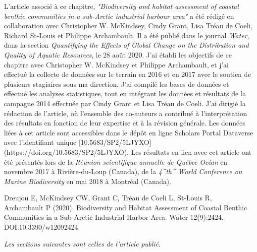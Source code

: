 L'article associé à ce chapitre, \textit{"Biodiversity and habitat assessment of coastal benthic communities in a sub-Arctic industrial harbour area"} a été rédigé en collaboration avec Christopher W. McKindsey, Cindy Grant, Lisa Tréau de Coeli, Richard St-Louis et Philippe Archambault. Il a été publié dans le journal \textit{Water}, dans la section \textit{Quantifying the Effects of Global Change on the Distribution and Quality of Aquatic Resources}, le 28 août 2020. J'ai établi les objectifs de ce chapitre avec Christopher W. McKindsey et Philippe Archambault, et j'ai effectué la collecte de données sur le terrain en 2016 et en 2017 avec le soutien de plusieurs stagiaires sous ma direction. J'ai compilé les bases de données et effectué les analyses statistiques, tout en intégrant les données et résultats de la campagne 2014 effectuée par Cindy Grant et Lisa Tréau de Coeli. J'ai dirigié la rédaction de l'article, où l'ensemble des co-auteurs a contribué à l'interprétation des résultats en fonction de leur expertise et à la révision générale. Les données liées à cet article sont accessibles dans le dépôt en ligne Scholars Portal Dataverse avec l'identifiant unique [10.5683/SP2/5LJYXO](https://doi.org/10.5683/SP2/5LJYXO). Les résultats en lien avec cet article ont été présentés lors de la \textit{Réunion scientifique annuelle de Québec Océan} en novembre 2017 à Rivière-du-Loup (Canada), de la \textit{4^th^ World Conference on Marine Biodiversity} en mai 2018 à Montréal (Canada). \linebreak[4]


\begin{singlespace}
Dreujou E, McKindsey CW, Grant C, Tréau de Coeli L, St-Louis R, Archambault P (2020). Biodiversity and Habitat Assessment of Coastal Benthic Communities in a Sub-Arctic Industrial Harbor Area. Water 12(9):2424. DOI:10.3390/w12092424.
\end{singlespace}

\textit{Les sections suivantes sont celles de l’article publié.}
